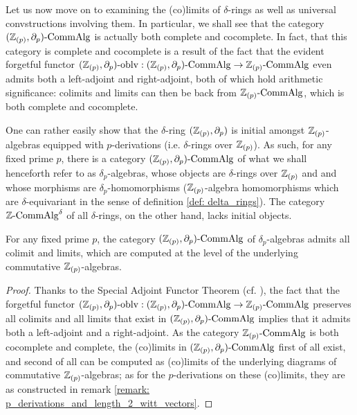             Let us now move on to examining the (co)limits of $\delta$-rings as well as universal convstructions involving them. In particular, we shall see that the category $(\mathbb{Z}_{(p)}, \partial_p)\text{-}\mathrm{Comm}\mathrm{Alg}$ is actually both complete and cocomplete. In fact, that this category is complete and cocomplete is a result of the fact that the evident forgetful functor $(\mathbb{Z}_{(p)}, \partial_p)\text{-}\mathrm{oblv}: (\mathbb{Z}_{(p)}, \partial_p)\text{-}\mathrm{Comm}\mathrm{Alg} \to \mathbb{Z}_{(p)}\text{-}\mathrm{Comm}\mathrm{Alg}$ even admits both a left-adjoint and right-adjoint, both of which hold arithmetic significance: colimits and limits can then be  back from $\mathbb{Z}_{(p)}\text{-}\mathrm{Comm}\mathrm{Alg}$, which is both complete and cocomplete.
            \begin{remark} \label{remark: initial_delta_ring}
                One can rather easily show that the $\delta$-ring $(\mathbb{Z}_{(p)}, \partial_p)$ is initial amongst $\mathbb{Z}_{(p)}$-algebras equipped with $p$-derivations (i.e. $\delta$-rings over $\mathbb{Z}_{(p)}$). As such, for any fixed prime $p$, there is a category $(\mathbb{Z}_{(p)}, \partial_p)\text{-}\mathrm{Comm}\mathrm{Alg}$ of what we shall henceforth refer to as $\delta_p$-algebras, whose objects are $\delta$-rings over $\mathbb{Z}_{(p)}$ and and whose morphisms are $\delta_p$-homomorphisms ($\mathbb{Z}_{(p)}$-algebra homomorphisms which are $\delta$-equivariant in the sense of definition \ref{def: delta_rings}). The  category $\mathbb{Z}\text{-}\mathrm{Comm}\mathrm{Alg}^{\delta}$ of all $\delta$-rings, on the other hand, lacks initial objects. 
            \end{remark}
            \begin{remark} \label{remark: p_derivations_and_length_2_witt_vectors} 
                
            \end{remark}
            \begin{proposition} \label{prop: (co)limits_of_delta_rings}
                For any fixed prime $p$, the category $(\mathbb{Z}_{(p)}, \partial_p)\text{-}\mathrm{Comm}\mathrm{Alg}$ of $\delta_p$-algebras admits all colimit and limits, which are computed at the level of the underlying commutative $\mathbb{Z}_{(p)}$-algebras. 
            \end{proposition}
                \begin{proof}
                    Thanks to the Special Adjoint Functor Theorem (cf. \cite{nlab:adjoint_functor_theorem}), the fact that the forgetful functor $(\mathbb{Z}_{(p)}, \partial_p)\text{-}\mathrm{oblv}: (\mathbb{Z}_{(p)}, \partial_p)\text{-}\mathrm{Comm}\mathrm{Alg} \to \mathbb{Z}_{(p)}\text{-}\mathrm{Comm}\mathrm{Alg}$ preserves all colimits and all limits that exist in $(\mathbb{Z}_{(p)}, \partial_p)\text{-}\mathrm{Comm}\mathrm{Alg}$ implies that it admits both a left-adjoint and a right-adjoint. As the category $\mathbb{Z}_{(p)}\text{-}\mathrm{Comm}\mathrm{Alg}$ is both cocomplete and complete, the (co)limits in $(\mathbb{Z}_{(p)}, \partial_p)\text{-}\mathrm{Comm}\mathrm{Alg}$ first of all exist, and second of all can be computed as (co)limits of the underlying diagrams of commutative $\mathbb{Z}_{(p)}$-algebras; as for the $p$-derivations on these (co)limits, they are as constructed in remark \ref{remark: p_derivations_and_length_2_witt_vectors}.
                \end{proof}                                                                                             
